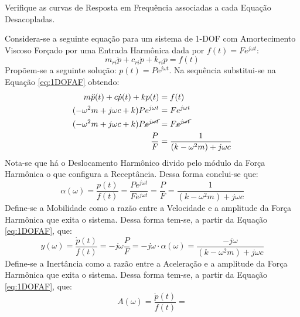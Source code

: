 \documentclass{article}
\begin{document}
\newpage\begin{exercise}\label{ex5}
    Verifique as curvas de Resposta em Frequência associadas a cada Equação Desacopladas.
\end{exercise}
\begin{resolution}
    Considera-se a seguinte equação para um sistema de 1-DOF com Amortecimento Viscoso Forçado por uma Entrada Harmônica dada por $f(t) = F e^{j\omega t}$:
    \begin{equation}
        m_{ri}\ddot{p} + c_{ri}\dot{p} + k_{ri} p = f(t)\label{eq:1DOFAF}
    \end{equation}
    \noindent Propõem-se a seguinte solução: $p(t) = P e^{j\omega t}$. Na sequência substitui-se na Equação \ref{eq:1DOFAF} obtendo:
    \begin{align*}
        m\ddot{p}(t) + c\dot{p}(t) + k p(t) &= f(t)\\
        (-\omega^2 m + j \omega c + k) P e^{j\omega t} &= F e^{j\omega t}\\
        (-\omega^2 m + j \omega c + k) P \cancel{e^{j\omega t}} &= F \cancel{e^{j\omega t}}\\
        \frac{P}{F} &= \frac{1}{(k -\omega^2 m) + j \omega c}
    \end{align*}
    Nota-se que há o Deslocamento Harmônico divido pelo módulo da Força Harmônica o que configura a Receptância. Dessa forma conclui-se que:
    \begin{equation}
        \boxed{
            \alpha (\omega) = 
            \frac{p(t)}{f(t)} = 
            \frac{P e^{j\omega t}}{F e^{j\omega t}} = 
            \frac{P}{F} = 
            \frac{1}{(k -\omega^2 m) + j \omega c}
        }
    \end{equation}
    Define-se a Mobilidade como a razão entre a Velocidade e a amplitude da Força Harmônica que exita o sistema. Dessa forma tem-se, a partir da Equação \ref{eq:1DOFAF}, que:
    \begin{equation}
        \boxed{
            y (\omega) = 
            \frac{\dot{p}(t)}{f(t)} = 
            -j\omega\frac{P}{F} = 
            -j\omega \cdot \alpha(\omega) = 
            \frac{-j\omega}{(k -\omega^2 m) + j \omega c}
        }
    \end{equation}
    Define-se a Inertância como a razão entre a Aceleração e a amplitude da Força Harmônica que exita o sistema. Dessa forma tem-se, a partir da Equação \ref{eq:1DOFAF}, que:
    \begin{equation}
        \boxed{
            A (\omega) = 
            \frac{\ddot{p}(t)}{f(t)} = 
}
\end{equation}
\end{resolution}
\end{document}
